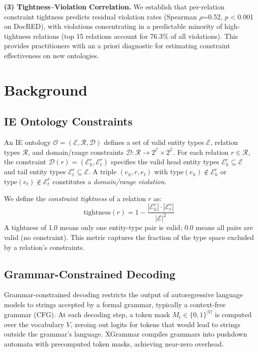 \documentclass[11pt,a4paper]{article}
\begin{document}
\noindent\textbf{(3) Tightness--Violation Correlation.}
We establish that per-relation constraint tightness predicts residual violation rates (Spearman $\rho$=0.52, $p<$0.001 on DocRED), with violations concentrating in a predictable minority of high-tightness relations (top 15 relations account for 76.3\% of all violations).
This provides practitioners with an a priori diagnostic for estimating constraint effectiveness on new ontologies.

\section{Background}

\subsection{IE Ontology Constraints}

An IE ontology $\mathcal{O} = (\mathcal{E}, \mathcal{R}, \mathcal{D})$ defines a set of valid entity types $\mathcal{E}$, relation types $\mathcal{R}$, and domain/range constraints $\mathcal{D}: \mathcal{R} \to 2^{\mathcal{E}} \times 2^{\mathcal{E}}$.
For each relation $r \in \mathcal{R}$, the constraint $\mathcal{D}(r) = (\mathcal{E}_h^r, \mathcal{E}_t^r)$ specifies the valid head entity types $\mathcal{E}_h^r \subseteq \mathcal{E}$ and tail entity types $\mathcal{E}_t^r \subseteq \mathcal{E}$.
A triple $(e_h, r, e_t)$ with $\text{type}(e_h) \notin \mathcal{E}_h^r$ or $\text{type}(e_t) \notin \mathcal{E}_t^r$ constitutes a \emph{domain/range violation}.

We define the \emph{constraint tightness} of a relation $r$ as:
\begin{equation}
    \text{tightness}(r) = 1 - \frac{|\mathcal{E}_h^r| \cdot |\mathcal{E}_t^r|}{|\mathcal{E}|^2}
    \label{eq:tightness}
\end{equation}
A tightness of 1.0 means only one entity-type pair is valid; 0.0 means all pairs are valid (no constraint). This metric captures the fraction of the type space excluded by a relation's constraints.

\subsection{Grammar-Constrained Decoding}

Grammar-constrained decoding restricts the output of autoregressive language models to strings accepted by a formal grammar, typically a context-free grammar (CFG).
At each decoding step, a token mask $M_t \in \{0,1\}^{|V|}$ is computed over the vocabulary $V$, zeroing out logits for tokens that would lead to strings outside the grammar's language.
XGrammar compiles grammars into pushdown automata with precomputed token masks, achieving near-zero overhead.
\end{document}

